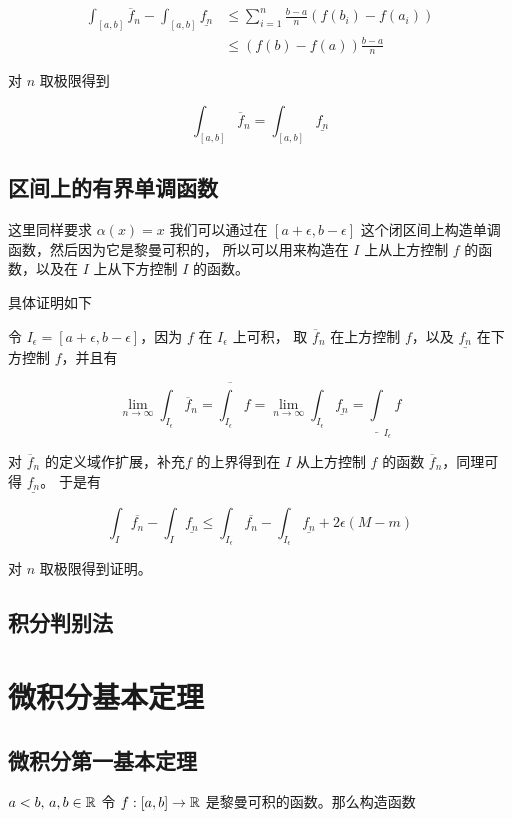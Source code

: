 \begin{align*}
\int_{[a,b]}\overline{f}_n - \int_{[a,b]}\underline{f_n} & \le \sum_{i=1}^{n}\frac{b - a}{n}(f(b_i) - f(a_i)) \\
    & \le (f(b) - f(a))\frac{b-a}{n}
\end{align*}

对 $n$ 取极限得到

\[
\int_{[a,b]}\overline{f}_n = \int_{[a,b]}\underline{f_n}
\]


\subsection{区间上的有界单调函数}

这里同样要求 $\alpha(x) = x$
我们可以通过在 $[a+\epsilon, b-\epsilon]$ 这个闭区间上构造单调函数，然后因为它是黎曼可积的，
所以可以用来构造在 $I$ 上从上方控制 $f$ 的函数，以及在 $I$ 上从下方控制 $I$ 的函数。

具体证明如下

令 $I_\epsilon = [a+\epsilon, b-\epsilon]$，因为 $f$ 在 $I_\epsilon$ 上可积，
取 $\overline{f}_n$ 在上方控制 $f$，以及 $\underline{f_n}$ 在下方控制 $f$，并且有

\[
\lim_{n \to \infty}\int_{I_\epsilon}\overline{f}_n = \overline{\int_{I_\epsilon}}f = \lim_{n \to \infty}\int_{I_\epsilon}\underline{f_n} = \underline{\int}_{I_\epsilon}f
\]

对 $\overline{f}_n$ 的定义域作扩展，补充$f$ 的上界得到在 $I$ 从上方控制 $f$ 的函数 $\overline{f}_n$，同理可得 $\underline{f_n}$。
于是有

\[
\int_{I}\overline{f_n} - \int_{I}\underline{f_n} \le \int_{I_\epsilon}\overline{f_n} - \int_{I_\epsilon}\underline{f_n} + 2\epsilon(M-m)
\]

对 $n$ 取极限得到证明。

\subsection{积分判别法}

\section{微积分基本定理}

\subsection{微积分第一基本定理}

$a < b,\, a,b \in \mathbb{R}$ 令 $f: [a,b] \to \mathbb{R}$ 是黎曼可积的函数。那么构造函数

